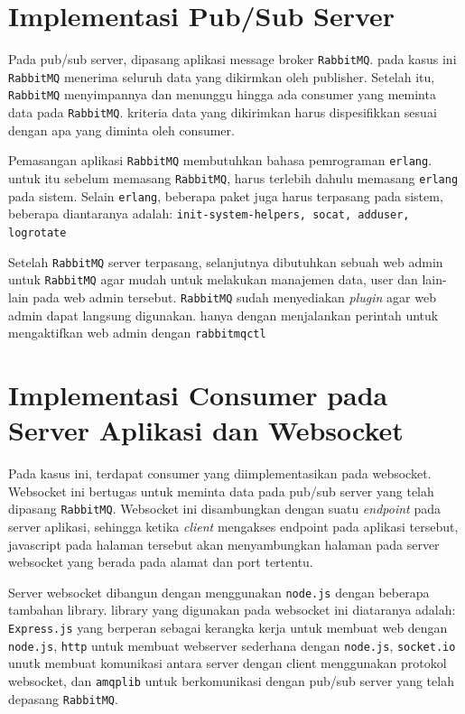     \section{Implementasi Pub/Sub Server}
    	Pada pub/sub server, dipasang aplikasi message broker \texttt{RabbitMQ}. pada kasus ini \texttt{RabbitMQ} menerima seluruh data yang dikirmkan oleh publisher. Setelah itu, \texttt{RabbitMQ} menyimpannya dan menunggu hingga ada consumer yang meminta data pada \texttt{RabbitMQ}. kriteria data yang dikirimkan harus dispesifikkan sesuai dengan apa yang diminta oleh consumer.
    	
    	Pemasangan aplikasi \texttt{RabbitMQ} membutuhkan bahasa pemrograman \texttt{erlang}. untuk itu sebelum memasang \texttt{RabbitMQ}, harus terlebih dahulu memasang \texttt{erlang} pada sistem. Selain \texttt{erlang}, beberapa paket juga harus terpasang pada sistem, beberapa diantaranya adalah: \texttt{init-system-helpers, socat, adduser, logrotate}
    	
    	Setelah \texttt{RabbitMQ} server terpasang, selanjutnya dibutuhkan sebuah web admin untuk \texttt{RabbitMQ} agar mudah untuk melakukan manajemen data, user dan lain-lain pada web admin tersebut. \texttt{RabbitMQ} sudah menyediakan \textit{plugin} agar web admin dapat langsung digunakan. hanya dengan menjalankan perintah untuk mengaktifkan web admin dengan \texttt{rabbitmqctl}
    
    \section{Implementasi Consumer pada Server Aplikasi dan Websocket}
		Pada kasus ini, terdapat consumer yang diimplementasikan pada websocket. Websocket ini bertugas untuk meminta data pada pub/sub server yang telah dipasang \texttt{RabbitMQ}. Websocket ini disambungkan dengan suatu \textit{endpoint} pada server aplikasi, sehingga ketika \textit{client} mengakses endpoint pada aplikasi tersebut, javascript pada halaman tersebut akan menyambungkan halaman pada server websocket yang berada pada alamat dan port tertentu.
		
		Server websocket dibangun dengan menggunakan \texttt{node.js} dengan beberapa tambahan library. library yang digunakan pada websocket ini diataranya adalah: \texttt{Express.js} yang berperan sebagai kerangka kerja untuk membuat web dengan \texttt{node.js}, \texttt{http} untuk membuat webserver sederhana dengan \texttt{node.js}, \texttt{socket.io} unutk membuat komunikasi antara server dengan client menggunakan protokol websocket, dan \texttt{amqplib} untuk berkomunikasi dengan pub/sub server yang telah depasang \texttt{RabbitMQ}.
		
